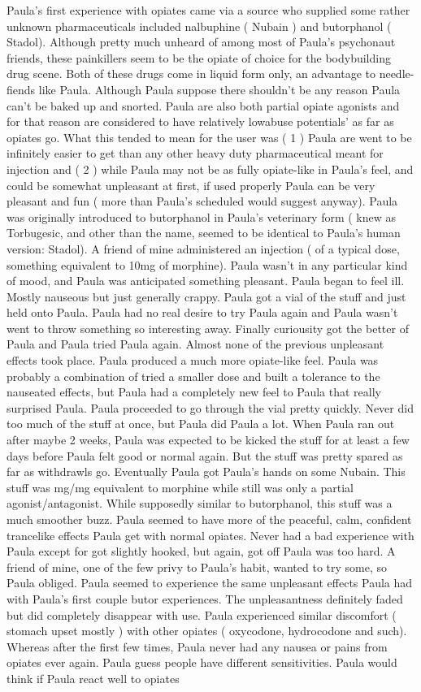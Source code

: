 \documentclass[12pt]{book}
\begin{document}
Paula's first experience with opiates came via a source who supplied some rather unknown pharmaceuticals included nalbuphine ( Nubain ) and butorphanol ( Stadol). Although pretty much unheard of among most of Paula's psychonaut friends, these painkillers seem to be the opiate of choice for the bodybuilding drug scene. Both of these drugs come in liquid form only, an advantage to needle-fiends like Paula. Although Paula suppose there shouldn't be any reason Paula can't be baked up and snorted. Paula are also both partial opiate agonists and for that reason are considered to have relatively lowabuse potentials' as far as opiates go. What this tended to mean for the user was ( 1 ) Paula are went to be infinitely easier to get than any other heavy duty pharmaceutical meant for injection and ( 2 ) while Paula may not be as fully opiate-like in Paula's feel, and could be somewhat unpleasant at first, if used properly Paula can be very pleasant and fun ( more than Paula's scheduled would suggest anyway). Paula was originally introduced to butorphanol in Paula's veterinary form ( knew as Torbugesic, and other than the name, seemed to be identical to Paula's human version: Stadol). A friend of mine administered an injection ( of a typical dose, something equivalent to 10mg of morphine). Paula wasn't in any particular kind of mood, and Paula was anticipated something pleasant. Paula began to feel ill. Mostly nauseous but just generally crappy. Paula got a vial of the stuff and just held onto Paula. Paula had no real desire to try Paula again and Paula wasn't went to throw something so interesting away. Finally curiousity got the better of Paula and Paula tried Paula again. Almost none of the previous unpleasant effects took place. Paula produced a much more opiate-like feel. Paula was probably a combination of tried a smaller dose and built a tolerance to the nauseated effects, but Paula had a completely new feel to Paula that really surprised Paula. Paula proceeded to go through the vial pretty quickly. Never did too much of the stuff at once, but Paula did Paula a lot. When Paula ran out after maybe 2 weeks, Paula was expected to be kicked the stuff for at least a few days before Paula felt good or normal again. But the stuff was pretty spared as far as withdrawls go. Eventually Paula got Paula's hands on some Nubain. This stuff was mg/mg equivalent to morphine while still was only a partial agonist/antagonist. While supposedly similar to butorphanol, this stuff was a much smoother buzz. Paula seemed to have more of the peaceful, calm, confident trancelike effects Paula get with normal opiates. Never had a bad experience with Paula except for got slightly hooked, but again, got off Paula was too hard. A friend of mine, one of the few privy to Paula's habit, wanted to try some, so Paula obliged. Paula seemed to experience the same unpleasant effects Paula had with Paula's first couple butor experiences. The unpleasantness definitely faded but did completely disappear with use. Paula experienced similar discomfort ( stomach upset mostly ) with other opiates ( oxycodone, hydrocodone and such). Whereas after the first few times, Paula never had any nausea or pains from opiates ever again. Paula guess people have different sensitivities. Paula would think if Paula react well to opiates 
\end{document}
